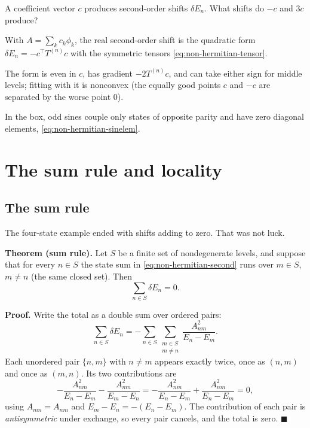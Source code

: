 \begin{checkpoint}
A coefficient vector $c$ produces second-order shifts $\delta E_n$. What shifts do $-c$ and $3c$ produce?
\end{checkpoint}

\begin{keyideas}
\item With $A=\sum_kc_k\phi_k$, the real second-order shift is the quadratic form $\delta E_n=-c^\top T^{(n)}c$ with the symmetric tensors \eqref{eq:non-hermitian-tensor}.
\item The form is even in $c$, has gradient $-2T^{(n)}c$, and can take either sign for middle levels; fitting with it is nonconvex (the equally good points $c$ and $-c$ are separated by the worse point $0$).
\item In the box, odd sines couple only states of opposite parity and have zero diagonal elements, \eqref{eq:non-hermitian-sinelem}.
\end{keyideas}

\section{The sum rule and locality}\label{sec:non-hermitian-sumrule}

\subsection{The sum rule}

The four-state example ended with shifts adding to zero. That was not luck.

\textbf{Theorem (sum rule).} Let $S$ be a finite set of nondegenerate levels, and suppose that for every $n\in S$ the state sum in \eqref{eq:non-hermitian-second} runs over $m\in S$, $m\ne n$ (the same closed set). Then
\begin{equation}
\sum_{n\in S}\delta E_n = 0 .
\label{eq:non-hermitian-sumrule}
\end{equation}

\textbf{Proof.} Write the total as a double sum over ordered pairs:
\begin{equation}
\sum_{n\in S}\delta E_n = -\sum_{n\in S}\sum_{\substack{m\in S\\ m\ne n}}\frac{A_{nm}^2}{E_n-E_m}.
\end{equation}
Each unordered pair $\{n,m\}$ with $n\ne m$ appears exactly twice, once as $(n,m)$ and once as $(m,n)$. Its two contributions are
\begin{equation}
-\frac{A_{nm}^2}{E_n-E_m} - \frac{A_{mn}^2}{E_m-E_n} = -\frac{A_{nm}^2}{E_n-E_m} + \frac{A_{nm}^2}{E_n-E_m} = 0,
\end{equation}
using $A_{mn}=A_{nm}$ and $E_m-E_n=-(E_n-E_m)$. The contribution of each pair is \emph{antisymmetric} under exchange, so every pair cancels, and the total is zero. $\blacksquare$

